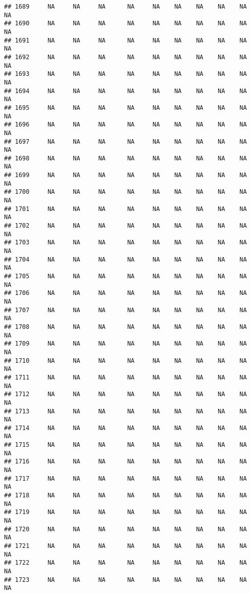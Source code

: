 \documentclass{article}\usepackage{graphicx, color}
\makeatletter
\newenvironment{kframe}{%
 \def\at@end@of@kframe{}%
 \ifinner\ifhmode%
  \def\at@end@of@kframe{\end{minipage}}%
  \begin{minipage}{\columnwidth}%
 \fi\fi%
 \def\FrameCommand##1{\hskip\@totalleftmargin \hskip-\fboxsep
 \colorbox{shadecolor}{##1}\hskip-\fboxsep
     \hskip-\linewidth \hskip-\@totalleftmargin \hskip\columnwidth}%
 \MakeFramed {\advance\hsize-\width
   \@totalleftmargin\z@ \linewidth\hsize
   \@setminipage}}%
 {\par\unskip\endMakeFramed%
 \at@end@of@kframe}
\newenvironment{knitrout}{}{} %
\makeatother
\begin{document}
\begin{knitrout}
\begin{kframe}
\begin{verbatim}
## 1689     NA     NA     NA      NA     NA    NA    NA    NA    NA     NA
## 1690     NA     NA     NA      NA     NA    NA    NA    NA    NA     NA
## 1691     NA     NA     NA      NA     NA    NA    NA    NA    NA     NA
## 1692     NA     NA     NA      NA     NA    NA    NA    NA    NA     NA
## 1693     NA     NA     NA      NA     NA    NA    NA    NA    NA     NA
## 1694     NA     NA     NA      NA     NA    NA    NA    NA    NA     NA
## 1695     NA     NA     NA      NA     NA    NA    NA    NA    NA     NA
## 1696     NA     NA     NA      NA     NA    NA    NA    NA    NA     NA
## 1697     NA     NA     NA      NA     NA    NA    NA    NA    NA     NA
## 1698     NA     NA     NA      NA     NA    NA    NA    NA    NA     NA
## 1699     NA     NA     NA      NA     NA    NA    NA    NA    NA     NA
## 1700     NA     NA     NA      NA     NA    NA    NA    NA    NA     NA
## 1701     NA     NA     NA      NA     NA    NA    NA    NA    NA     NA
## 1702     NA     NA     NA      NA     NA    NA    NA    NA    NA     NA
## 1703     NA     NA     NA      NA     NA    NA    NA    NA    NA     NA
## 1704     NA     NA     NA      NA     NA    NA    NA    NA    NA     NA
## 1705     NA     NA     NA      NA     NA    NA    NA    NA    NA     NA
## 1706     NA     NA     NA      NA     NA    NA    NA    NA    NA     NA
## 1707     NA     NA     NA      NA     NA    NA    NA    NA    NA     NA
## 1708     NA     NA     NA      NA     NA    NA    NA    NA    NA     NA
## 1709     NA     NA     NA      NA     NA    NA    NA    NA    NA     NA
## 1710     NA     NA     NA      NA     NA    NA    NA    NA    NA     NA
## 1711     NA     NA     NA      NA     NA    NA    NA    NA    NA     NA
## 1712     NA     NA     NA      NA     NA    NA    NA    NA    NA     NA
## 1713     NA     NA     NA      NA     NA    NA    NA    NA    NA     NA
## 1714     NA     NA     NA      NA     NA    NA    NA    NA    NA     NA
## 1715     NA     NA     NA      NA     NA    NA    NA    NA    NA     NA
## 1716     NA     NA     NA      NA     NA    NA    NA    NA    NA     NA
## 1717     NA     NA     NA      NA     NA    NA    NA    NA    NA     NA
## 1718     NA     NA     NA      NA     NA    NA    NA    NA    NA     NA
## 1719     NA     NA     NA      NA     NA    NA    NA    NA    NA     NA
## 1720     NA     NA     NA      NA     NA    NA    NA    NA    NA     NA
## 1721     NA     NA     NA      NA     NA    NA    NA    NA    NA     NA
## 1722     NA     NA     NA      NA     NA    NA    NA    NA    NA     NA
## 1723     NA     NA     NA      NA     NA    NA    NA    NA    NA     NA

\end{verbatim}
\end{kframe}
\end{knitrout}
\end{document}
